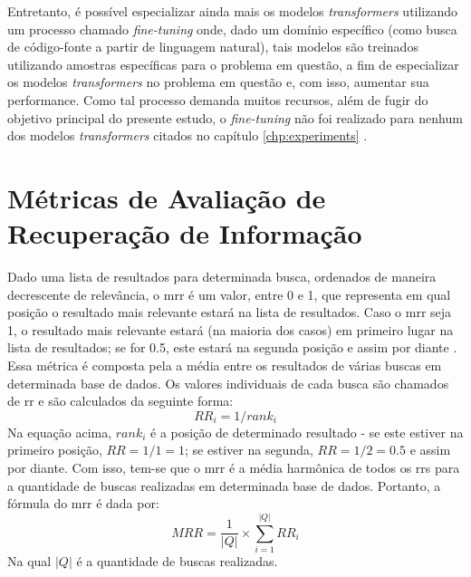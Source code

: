 Entretanto, é possível especializar ainda mais os modelos \textit{transformers} utilizando um processo chamado \textit{fine-tuning} onde, dado um domínio específico (como busca de código-fonte a partir de linguagem natural), tais modelos são treinados utilizando amostras específicas para o problema em questão, a fim de especializar os modelos \textit{transformers} no problema em questão e, com isso, aumentar sua performance. Como tal processo demanda muitos recursos, além de fugir do objetivo principal do presente estudo, o \textit{fine-tuning} não foi realizado para nenhum dos modelos \textit{transformers} citados no capítulo \ref{chp:experiments} \cite{Tay2021ScaleEI}.

\section{Métricas de Avaliação de Recuperação de Informação}
Dado uma lista de resultados para determinada busca, ordenados de maneira decrescente de relevância, o \gls{mrr} é um valor, entre 0 e 1, que representa em qual posição o resultado mais relevante estará na lista de resultados. Caso o \gls{mrr} seja 1, o resultado mais relevante estará (na maioria dos casos) em primeiro lugar na lista de resultados; se for 0.5, este estará na segunda posição e assim por diante \cite{Craswell2009}. Essa métrica é composta pela a média entre os resultados de várias buscas em determinada base de dados. Os valores individuais de cada busca são chamados de \gls{rr} e são calculados da seguinte forma:
\begin{equation*}
    RR_i=1/rank_i
\end{equation*}
Na equação acima, $rank_i$ é a posição de determinado resultado - se este estiver na primeiro posição, $RR=1/1=1$; se estiver na segunda, $RR=1/2=0.5$ e assim por diante. Com isso, tem-se que o \gls{mrr} é a média harmônica de todos os \glspl{rr} para a quantidade de buscas realizadas em determinada base de dados. Portanto, a fórmula do \gls{mrr} é dada por:
\begin{equation*}
    MRR = \frac{1}{|Q|} \times \sum_{i=1}^{|Q|} RR_i
\end{equation*}
Na qual $|Q|$ é a quantidade de buscas realizadas.

